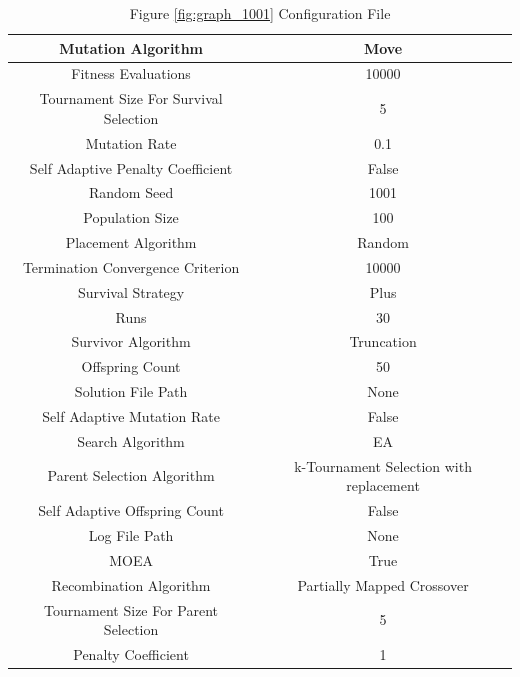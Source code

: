 \documentclass{standalone}
\begin{document}
\begin{table}[!htb]
	\centering
	\caption{Figure \ref{fig:graph_1001} Configuration File}
	\label{tab:graph_1001}
	\begin{tabular}{| c | c |}
		\hline
		Mutation Algorithm		& Move		 \\
		\hline
		Fitness Evaluations		& 10000		 \\
		\hline
		Tournament Size For Survival Selection		& 5		 \\
		\hline
		Mutation Rate		& 0.1		 \\
		\hline
		Self Adaptive Penalty Coefficient		& False		 \\
		\hline
		Random Seed		& 1001		 \\
		\hline
		Population Size		& 100		 \\
		\hline
		Placement Algorithm		& Random		 \\
		\hline
		Termination Convergence Criterion		& 10000		 \\
		\hline
		Survival Strategy		& Plus		 \\
		\hline
		Runs		& 30		 \\
		\hline
		Survivor Algorithm		& Truncation		 \\
		\hline
		Offspring Count		& 50		 \\
		\hline
		Solution File Path		& None		 \\
		\hline
		Self Adaptive Mutation Rate		& False		 \\
		\hline
		Search Algorithm		& EA		 \\
		\hline
		Parent Selection Algorithm		& k-Tournament Selection with replacement		 \\
		\hline
		Self Adaptive Offspring Count		& False		 \\
		\hline
		Log File Path		& None		 \\
		\hline
		MOEA		& True		 \\
		\hline
		Recombination Algorithm		& Partially Mapped Crossover		 \\
		\hline
		Tournament Size For Parent Selection		& 5		 \\
		\hline
		Penalty Coefficient		& 1		 \\
		\hline
	\end{tabular}
\end{table}
\end{document}
